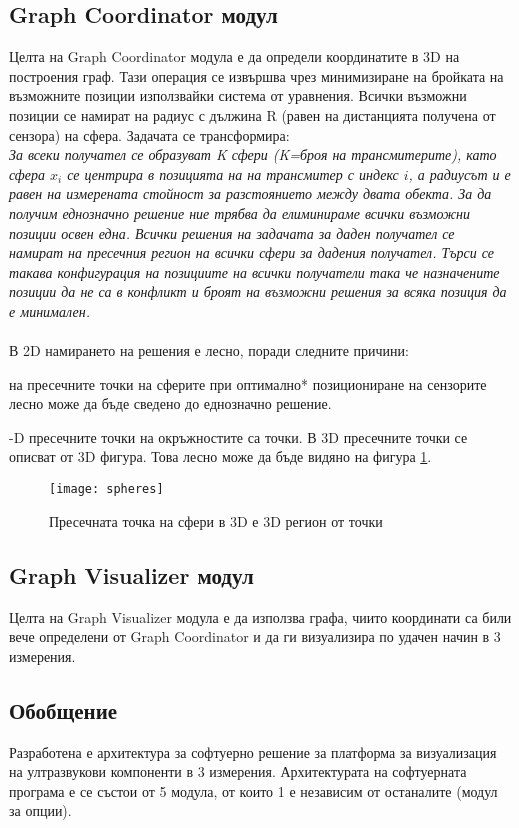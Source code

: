 \pagebreak

\subsection{Graph Coordinator модул}
Целта на Graph Coordinator модула е да определи координатите в 3D на построения граф. Тази операция се извършва чрез минимизиране на бройката на възможните позиции използвайки система от уравнения. Всички възможни позиции се намират на радиус с дължина R (равен на дистанцията получена от сензора) на сфера. Задачата се трансформира:\\

\textit{За всеки получател се образуват K сфери (K=броя на трансмитерите), като сфера $x_i$ се центрира в позицията на на трансмитер с индекс $i$, а радиусът и е равен на измерената стойност за разстоянието между двата обекта. За да получим еднозначно решение ние трябва да елиминираме всички възможни позиции освен една. Всички решения на задачата за даден получател се намират на пресечния регион на всички сфери за дадения получател. Търси се такава конфигурация на позициите на всички получатели така че назначените позиции да не са в конфликт и броят на възможни решения за всяка позиция да е минимален.}\\\\

В 2D намирането на решения е лесно, поради следните причини:

\begin{enumerate}
     на пресечните точки на сферите при оптимално* позициониране на сензорите лесно може да бъде сведено до еднозначно решение.

    -D пресечните точки на окръжностите са точки. В 3D пресечните точки се описват от 3D фигура. Това лесно може да бъде видяно на фигура \ref{spheres}.
\end{enumerate}

\begin{figure}
    \centerline{\texttt{[image: spheres]}}
    \caption{Пресечната точка на сфери в 3D е 3D регион от точки}
    \label{spheres}
\end{figure}

\pagebreak

\subsection{Graph Visualizer модул}
Целта на Graph Visualizer модула е да използва графа, чиито координати са били вече определени от Graph Coordinator и да ги визуализира по удачен начин в 3 измерения.


\subsection{Обобщение}
Разработена е архитектура за софтуерно решение за платформа за визуализация на ултразвукови компоненти в 3 измерения. Архитектурата на софтуерната програма е се състои от 5 модула, от които 1 е независим от останалите (модул за опции). 